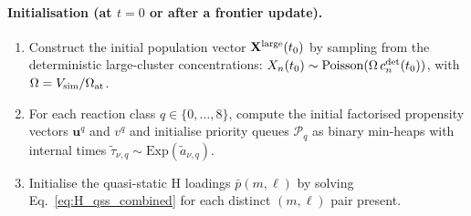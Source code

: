 \paragraph{Initialisation (at $t = 0$ or after a frontier
update).}
\begin{enumerate}
  \item Construct the initial population vector
        $\mathbf{X}^{\rm large}(t_0)$ by sampling from the
        deterministic large-cluster concentrations:
        $X_n(t_0) \sim \mathrm{Poisson}(\Omega\,c_n^{\rm det}(t_0))$,
        with $\Omega = V_{\rm sim}/\Omega_{\rm at}$.
  \item For each reaction class $q \in \{0,\ldots,8\}$, compute the
        initial factorised propensity vectors $\mathbf{u}^q$ and $v^q$
        and initialise priority queues $\mathcal{P}_q$ as binary min-heaps
        with internal times $\tilde{\tau}_{\nu,q} \sim
        \mathrm{Exp}(\tilde{a}_{\nu,q})$.
  \item Initialise the quasi-static H loadings $\bar{p}(m,\ell)$ by
        solving Eq.~\eqref{eq:H_qss_combined} for each distinct
        $(m,\ell)$ pair present.
\end{enumerate}


